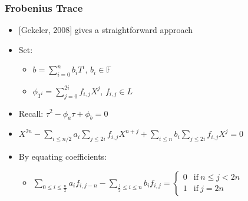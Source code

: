 \documentclass{beamer}
\begin{document}
\begin{frame}
\frametitle{Frobenius Trace}

\begin{itemize}
    \item $[$Gekeler, 2008] gives a straightforward approach
    \item Set:
    \begin{itemize}
        \item $b = \sum_{i=0}^n b_i T^i$, $b_i \in \mathbb{F}$
        \item $\phi_{T^i} = \sum_{j=0}^{2i}f_{i,j} X^j$, $f_{i,j} \in L$
    \end{itemize}
    \item Recall: $\tau^2 - \phi_a\tau + \phi_b = 0$
    \item $X^{2n} - \sum_{i \leq n/2}a_i\sum_{j\leq 2i}f_{i,j} X^{n + j} + \sum_{i\leq n}b_i \sum_{j \leq 2i}f_{i,j} X^j = 0 $
        \item By equating coefficients:
    \begin{itemize}
    \item 
    $\sum_{0 \leq i \leq \frac{n}{2}} a_i f_{i,j-n} - \sum_{\frac{j}{2} \leq i \leq n} b_if_{i,j} =  \begin{cases} 0 & \text{if}\ n \leq j < 2n \\ 1 & \text{if}\ j = 2n   \end{cases}$
    \end{itemize}
\end{itemize}


\end{frame}





\end{document}
